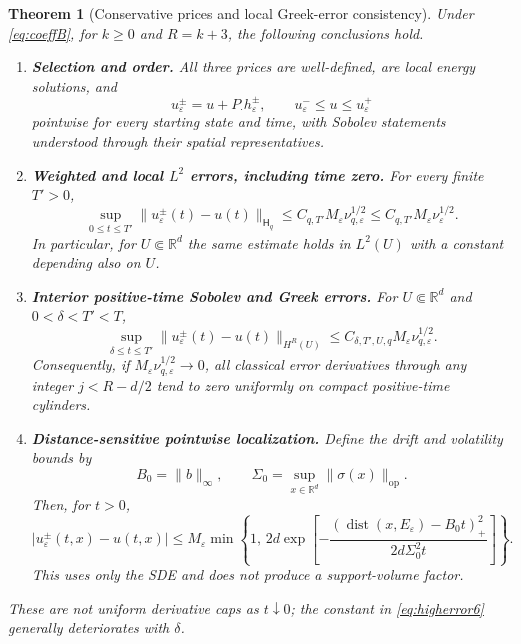 \documentclass[11pt,a4paper]{article}
\newtheorem{theorem}{Theorem}[section]
\theoremstyle{definition}\newtheorem{definition}{Definition}[section]\newtheorem{example}[theorem]{Example}
\theoremstyle{remark}\newtheorem{remark}[theorem]{Remark}\newtheorem{remarkSix}{Remark}[section]
\newcommand{\Rd}{\mathbb R^d}
\newcommand{\norm}[1]{\lVert #1\rVert}
\newcommand{\abs}[1]{\lvert #1\rvert}
\newcommand{\HH}{\mathsf H_q}
\begin{document}
\begin{theorem}[Conservative prices and local Greek-error consistency]\label{thm:errors6}
Under \eqref{eq:coeffB}, for $k\ge0$ and $R=k+3$, the following conclusions hold.
\begin{enumerate}[label=\textup{(\roman*)},leftmargin=9mm,itemsep=5pt]
\item \textbf{Selection and order.} All three prices are well-defined, are local energy solutions, and
\begin{equation}\label{eq:order6}
 u_\varepsilon^\pm=u+P_\cdot h_\varepsilon^\pm,
 \qquad u_\varepsilon^-\le u\le u_\varepsilon^+
\end{equation}
pointwise for every starting state and time, with Sobolev statements understood through their spatial representatives.
\item \textbf{Weighted and local $L^2$ errors, including time zero.} For every finite $T'>0$,
\begin{equation}\label{eq:weightederror6}
 \sup_{0\le t\le T'}\norm{u_\varepsilon^\pm(t)-u(t)}_{\HH}
 \le C_{q,T'}M_\varepsilon\nu_{q,\varepsilon}^{1/2}
 \le C_{q,T'}M_\varepsilon\nu_\varepsilon^{1/2}.
\end{equation}
In particular, for $U\Subset\Rd$ the same estimate holds in $L^2(U)$ with a constant depending also on $U$.
\item \textbf{Interior positive-time Sobolev and Greek errors.} For $U\Subset\Rd$ and $0<\delta<T'<T$,
\begin{equation}\label{eq:higherror6}
 \sup_{\delta\le t\le T'}
 \norm{u_\varepsilon^\pm(t)-u(t)}_{H^R(U)}
 \le C_{\delta,T',U,q}M_\varepsilon\nu_{q,\varepsilon}^{1/2}.
\end{equation}
Consequently, if $M_\varepsilon\nu_{q,\varepsilon}^{1/2}\to0$, all classical error derivatives through any integer $j<R-d/2$ tend to zero uniformly on compact positive-time cylinders.
\item \textbf{Distance-sensitive pointwise localization.}
Define the drift and volatility bounds by
\[
 B_0=\norm{b}_{\infty},\qquad
 \Sigma_0=\sup_{x\in\Rd}\norm{\sigma(x)}_{\mathrm{op}}.
\]
Then, for $t>0$,
\begin{equation}\label{eq:SDEtail6}
 \abs{u_\varepsilon^\pm(t,x)-u(t,x)}
 \le M_\varepsilon\min\!\left\{1,\,2d
 \exp\!\left[-\frac{(\operatorname{dist}(x,E_\varepsilon)-B_0t)_+^2}{2d\Sigma_0^2t}\right]\right\}.
\end{equation}
This uses only the SDE and does \emph{not} produce a support-volume factor.
\end{enumerate}
These are not uniform derivative caps as $t\downarrow0$; the constant in \eqref{eq:higherror6} generally deteriorates with $\delta$.
\end{theorem}
\end{document}

